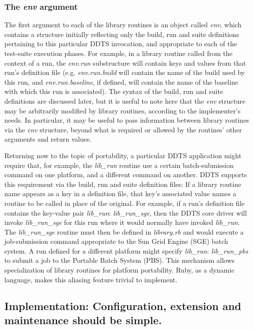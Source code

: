 \documentclass[conference]{IEEEtran}
\begin{document}
\subsubsection{The \emph{env} argument}
The first argument to each of the library routines is an object called \emph{env}, which contains a structure initially reflecting only the build, run and suite definitions pertaining to this particular DDTS invocation, and appropriate to each of the test-suite execution phases. For example, in a library routine called from the context of a run, the \emph{env.run} substructure will contain keys and values from that run's definition file (e.g. \emph{env.run.build} will contain the name of the build used by this run, and \emph{env.run.baseline}, if defined, will contain the name of the baseline with which this run is associated). The syntax of the build, run and suite definitions are discussed later, but it is useful to note here that the \emph{env} structure may be arbitrarily modified by library routines, according to the implementer's needs. In particular, it may be useful to pass information between library routines via the \emph{env} structure, beyond what is required or allowed by the routines' other arguments and return values.

Returning now to the topic of portability, a particular DDTS application might require that, for example, the \emph{lib\_run} routine use a certain batch-submission command on one platform, and a different command on another. DDTS supports this requirement via the build, run and suite definition files: If a library routine name appears as a key in a definition file, that key's associated value names a routine to be called in place of the original. For example, if a run's definition file contains the key-value pair \emph{lib\_run}: \emph{lib\_run\_sge}, then the DDTS core driver will invoke \emph{lib\_run\_sge} for this run where it would normally have invoked \emph{lib\_run}. The \emph{lib\_run\_sge} routine must then be defined in \emph{library.rb} and would execute a job-submission command appropriate to the Sun Grid Engine (SGE) batch system. A run defined for a different platform might specify \emph{lib\_run}: \emph{lib\_run\_pbs} to submit a job to the Portable Batch System (PBS). This mechanism allows specialization of library routines for platform portability. Ruby, as a dynamic language, makes this aliasing feature trivial to implement.

\subsection{Implementation: Configuration, extension and maintenance should be simple.}
\end{document}
